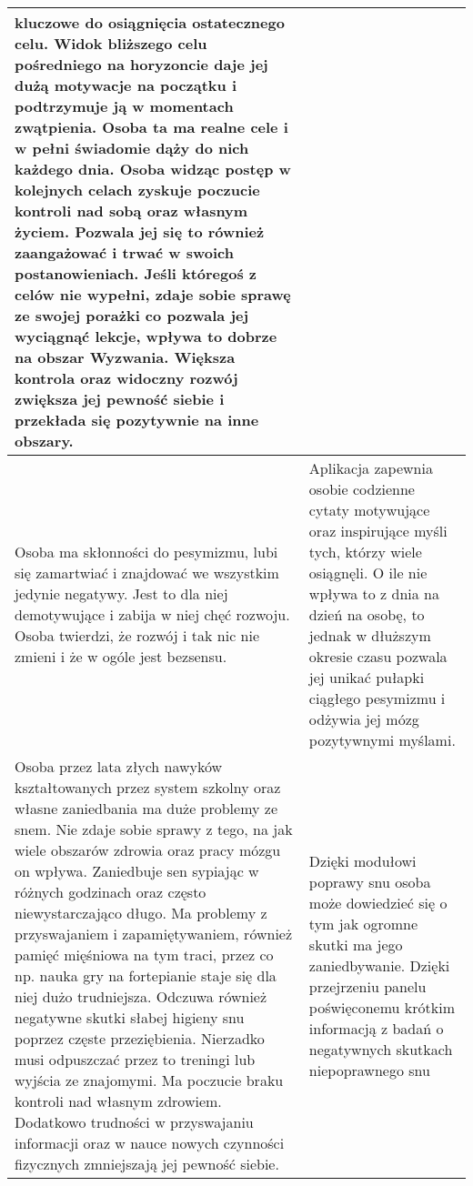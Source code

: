 \documentclass[12pt, letterpaper]{article}
\begin{document}
\begin{center}
\begin{longtable}{ | m{} | m{} | }
            kluczowe do osiągnięcia ostatecznego celu. Widok bliższego celu
            pośredniego na horyzoncie daje jej dużą motywacje na początku i
            podtrzymuje ją w momentach zwątpienia. Osoba ta ma realne cele i w
            pełni świadomie dąży do nich każdego dnia. Osoba widząc postęp w
            kolejnych celach zyskuje poczucie kontroli nad sobą oraz własnym
            życiem. Pozwala jej się to również zaangażować i trwać w swoich
            postanowieniach. Jeśli któregoś z celów nie wypełni, zdaje sobie
            sprawę ze swojej porażki co pozwala jej wyciągnąć lekcje, wpływa to
            dobrze na obszar Wyzwania. Większa kontrola oraz widoczny rozwój
            zwiększa jej pewność siebie i przekłada się pozytywnie na inne
            obszary. \\
            \hline  
            Osoba ma skłonności do pesymizmu, lubi się zamartwiać i znajdować we
            wszystkim jedynie negatywy. Jest to dla niej demotywujące i zabija w
            niej chęć rozwoju. Osoba twierdzi, że rozwój i tak nic nie zmieni i
            że w ogóle jest bezsensu. & Aplikacja zapewnia osobie codzienne
            cytaty motywujące oraz inspirujące myśli tych, którzy wiele
            osiągnęli. O ile nie wpływa to z dnia na dzień na osobę, to jednak w
            dłuższym okresie czasu pozwala jej unikać pułapki ciągłego pesymizmu
            i odżywia jej mózg pozytywnymi myślami. \\
            \hline
            Osoba przez lata złych nawyków kształtowanych przez system szkolny
            oraz własne zaniedbania ma duże problemy ze snem. Nie zdaje sobie
            sprawy z tego, na jak wiele obszarów zdrowia oraz pracy mózgu on
            wpływa. Zaniedbuje sen sypiając w różnych godzinach oraz często
            niewystarczająco długo. Ma problemy z przyswajaniem i
            zapamiętywaniem, również pamięć mięśniowa na tym traci, przez co np.
            nauka gry na fortepianie staje się dla niej dużo trudniejsza.
            Odczuwa również negatywne skutki słabej higieny snu poprzez częste
            przeziębienia. Nierzadko musi odpuszczać przez to treningi lub
            wyjścia ze znajomymi. Ma poczucie braku kontroli nad własnym
            zdrowiem. Dodatkowo trudności w przyswajaniu informacji oraz w nauce
            nowych czynności fizycznych zmniejszają jej pewność siebie. & Dzięki
            modułowi poprawy snu osoba może dowiedzieć się o tym jak ogromne
            skutki ma jego zaniedbywanie. Dzięki przejrzeniu panelu poświęconemu
            krótkim informacją z badań o negatywnych skutkach niepoprawnego snu

\end{longtable}
\end{center}
\end{document}
